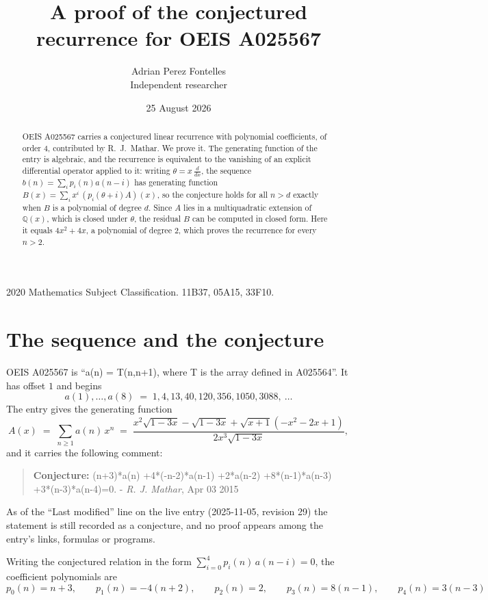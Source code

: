 \documentclass[11pt,a4paper]{article}
\title{A proof of the conjectured recurrence for OEIS A025567}
\author{Adrian Perez Fontelles\\ \small Independent researcher}
\date{25 August 2026}
\theoremstyle{plain}
\theoremstyle{definition}
\begin{document}
\maketitle

\begin{abstract}
OEIS A025567 carries a conjectured linear recurrence with polynomial coefficients, of
order 4, contributed by R.~J.~Mathar. We prove it. The generating function of the
entry is algebraic, and the recurrence is equivalent to the vanishing of an explicit
differential operator applied to it: writing $\theta=x\,\frac{d}{dx}$, the sequence
$b(n)=\sum_{i}p_{i}(n)a(n-i)$ has generating function
$B(x)=\sum_{i}x^{i}\,(p_{i}(\theta+i)A)(x)$, so the conjecture holds for all $n>d$ exactly
when $B$ is a polynomial of degree $d$. Since $A$ lies in a multiquadratic extension of
$\mathbb{Q}(x)$, which is closed under $\theta$, the residual $B$ can be computed in
closed form. Here it equals $4 x^{2} + 4 x$, a polynomial of degree $2$, which proves
the recurrence for every $n>2$.
\end{abstract}

\noindent\small 2020 Mathematics Subject Classification. 11B37, 05A15, 33F10.\normalsize

\section{The sequence and the conjecture}

OEIS A025567 is ``a(n) = T(n,n+1), where T is the array defined in A025564''. It has offset $1$ and begins
\[
a(1),\dots,a(8)\;=\;1, 4, 13, 40, 120, 356, 1050, 3088,\ \dots
\]
The entry gives the generating function
\begin{equation}\label{eq:gf}
A(x)\;=\;\sum_{n\ge 1} a(n)\,x^{n}\;=\;\frac{x^{2} \sqrt{1 - 3 x} - \sqrt{1 - 3 x} + \sqrt{x + 1} \left(- x^{2} - 2 x + 1\right)}{2 x^{3} \sqrt{1 - 3 x}} ,
\end{equation}
and it carries the following comment:
\begin{quote}\small
\textbf{Conjecture:} (n+3)*a(n) +4*(-n-2)*a(n-1) +2*a(n-2) +8*(n-1)*a(n-3) +3*(n-3)*a(n-4)=0. - \emph{R. J. Mathar}, Apr 03 2015
\end{quote}
As of the ``Last modified'' line on the live entry (2025-11-05, revision 29) the
statement is still recorded as a conjecture, and no proof appears among the entry's links,
formulas or programs.

Writing the conjectured relation in the form $\sum_{i=0}^{4}p_{i}(n)\,a(n-i)=0$,
the coefficient polynomials are
\[
p_{0}(n)=n + 3,\qquad p_{1}(n)=- 4 \left(n + 2\right),\qquad p_{2}(n)=2,\qquad p_{3}(n)=8 \left(n - 1\right),\qquad p_{4}(n)=3 \left(n - 3\right)
\]
\end{document}
